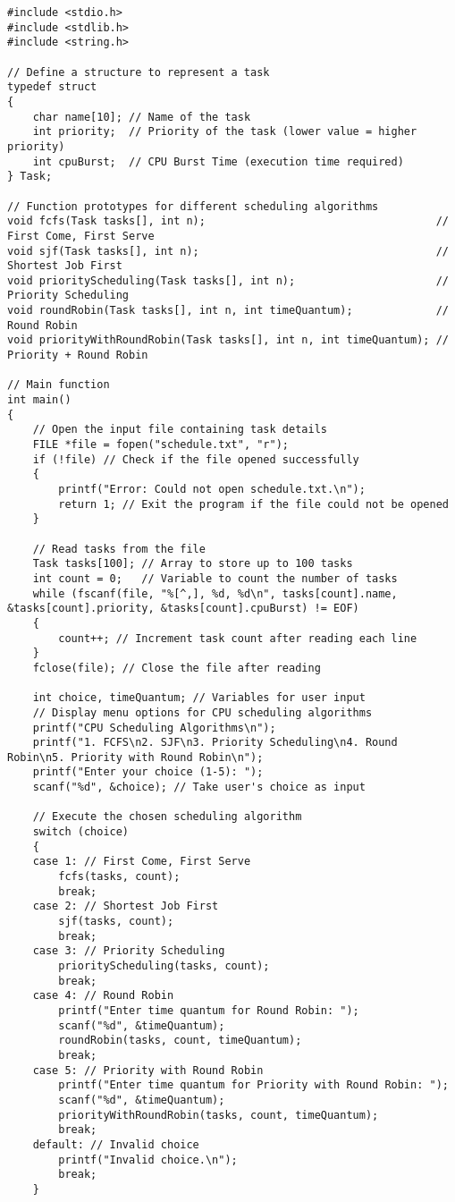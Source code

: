 \documentclass[a4paper,12pt]{article}
\begin{document}
\begin{lstlisting}[caption={CPU Scheduling Algorithms Implementation}, label={lst:cpu-scheduling}]
#include <stdio.h>
#include <stdlib.h>
#include <string.h>

// Define a structure to represent a task
typedef struct
{
    char name[10]; // Name of the task
    int priority;  // Priority of the task (lower value = higher priority)
    int cpuBurst;  // CPU Burst Time (execution time required)
} Task;

// Function prototypes for different scheduling algorithms
void fcfs(Task tasks[], int n);                                    // First Come, First Serve
void sjf(Task tasks[], int n);                                     // Shortest Job First
void priorityScheduling(Task tasks[], int n);                      // Priority Scheduling
void roundRobin(Task tasks[], int n, int timeQuantum);             // Round Robin
void priorityWithRoundRobin(Task tasks[], int n, int timeQuantum); // Priority + Round Robin

// Main function
int main()
{
    // Open the input file containing task details
    FILE *file = fopen("schedule.txt", "r");
    if (!file) // Check if the file opened successfully
    {
        printf("Error: Could not open schedule.txt.\n");
        return 1; // Exit the program if the file could not be opened
    }

    // Read tasks from the file
    Task tasks[100]; // Array to store up to 100 tasks
    int count = 0;   // Variable to count the number of tasks
    while (fscanf(file, "%[^,], %d, %d\n", tasks[count].name, &tasks[count].priority, &tasks[count].cpuBurst) != EOF)
    {
        count++; // Increment task count after reading each line
    }
    fclose(file); // Close the file after reading

    int choice, timeQuantum; // Variables for user input
    // Display menu options for CPU scheduling algorithms
    printf("CPU Scheduling Algorithms\n");
    printf("1. FCFS\n2. SJF\n3. Priority Scheduling\n4. Round Robin\n5. Priority with Round Robin\n");
    printf("Enter your choice (1-5): ");
    scanf("%d", &choice); // Take user's choice as input

    // Execute the chosen scheduling algorithm
    switch (choice)
    {
    case 1: // First Come, First Serve
        fcfs(tasks, count);
        break;
    case 2: // Shortest Job First
        sjf(tasks, count);
        break;
    case 3: // Priority Scheduling
        priorityScheduling(tasks, count);
        break;
    case 4: // Round Robin
        printf("Enter time quantum for Round Robin: ");
        scanf("%d", &timeQuantum);
        roundRobin(tasks, count, timeQuantum);
        break;
    case 5: // Priority with Round Robin
        printf("Enter time quantum for Priority with Round Robin: ");
        scanf("%d", &timeQuantum);
        priorityWithRoundRobin(tasks, count, timeQuantum);
        break;
    default: // Invalid choice
        printf("Invalid choice.\n");
        break;
    }


\end{lstlisting}
\end{document}
